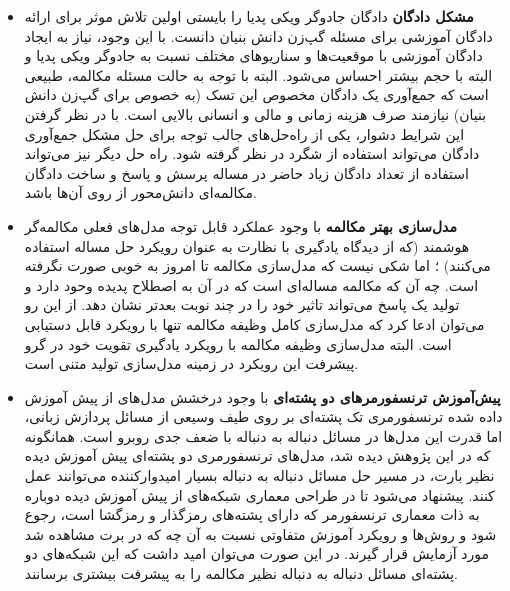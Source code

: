 \begin{itemize}
	\item 
	\textbf{مشکل دادگان}
	دادگان جادوگر ویکی پدیا را بایستی اولین تلاش موثر برای ارائه دادگان آموزشی برای مسئله گپ‌زن دانش بنیان دانست. با این وجود،‌ نیاز به ایجاد دادگان آموزشی با موقعیت‌ها و سناریو‌های مختلف نسبت به جادوگر ویکی پدیا و البته با حجم بیشتر احساس می‌شود. البته با توجه به حالت مسئله مکالمه،
	 طبیعی است که جمع‌آوری یک دادگان مخصوص این تسک (به خصوص برای گپ‌زن دانش بنیان) نیازمند صرف هزینه زمانی و مالی و انسانی بالایی است. با در نظر گرفتن این شرایط دشوار،
	 یکی از راه‌حل‌های جالب توجه برای حل مشکل جمع‌آوری دادگان می‌تواند استفاده از شگرد 
	 در نظر گرفته شود. راه حل دیگر نیز می‌تواند استفاده از تعداد دادگان زیاد حاضر در مساله پرسش و پاسخ و ساخت دادگان مکالمه‌ای دانش‌محور از روی آن‌ها باشد.
	\item
	\textbf{مدل‌سازی بهتر مکالمه}
	با وجود عملکرد قابل توجه مدل‌های فعلی مکالمه‌گر هوشمند (که از دیدگاه یادگیری با نظارت به عنوان رویکرد حل مساله استفاده می‌کنند) ؛ اما شکی نیست که مدل‌سازی مکالمه تا امروز به خوبی صورت نگرفته است. چه ‌آن که مکالمه مساله‌ای است که در آن به اصطلاح پدیده 
	وحود دارد و تولید یک پاسخ می‌تواند تاثیر خود را در چند نوبت بعدتر نشان دهد. 
	از این رو می‌توان ادعا کرد که مدل‌سازی کامل وظیفه مکالمه تنها با رویکرد 
	قابل دستیابی است. البته مدل‌سازی وظیفه مکالمه با رویکرد یادگیری تقویت خود در گرو پیشرفت این رویکرد در زمینه مدل‌سازی تولید متنی است.
	\item
	\textbf{پیش‌آموزش ترنسفورمر‌های دو پشته‌ای}
	با وجود درخشش مدل‌های از پیش آموزش داده شده ترنسفورمری تک پشته‌ای بر روی طیف وسیعی از مسائل پردازش زبانی، اما قدرت این مدل‌ها در مسائل دنباله به دنباله با ضعف جدی روبرو است. همانگونه که در این پژوهش دیده شد،‌ مدل‌های ترنسفورمری دو پشته‌ای پیش آموزش دیده نظیر بارت، در مسیر حل مسائل دنباله به دنباله بسیار امیدوارکننده می‌توانند عمل کنند. پیشنهاد می‌شود تا در طراحی معماری شبکه‌های از پیش آموزش دیده دوباره به ذات معماری ترنسفورمر که دارای پشته‌های رمزگذار و رمزگشا است، رجوع شود و روش‌ها و رویکرد آموزش متفاوتی نسبت به آن چه که در برت مشاهده شد مورد آزمایش قرار گیرند. در این صورت می‌توان امید داشت که این شبکه‌های دو پشته‌ای مسائل دنباله به دنباله نظیر مکالمه را به پیشرفت بیشتری برسانند.
\end{itemize}


